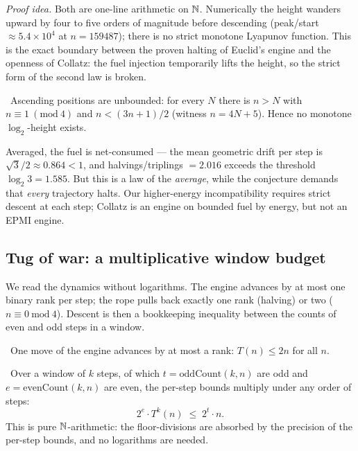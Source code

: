 \emph{Proof idea.} Both are one-line arithmetic on $\mathbb{N}$. Numerically the height wanders upward by
four to five orders of magnitude before descending (peak/start $\approx 5.4\times 10^{4}$ at
$n=159487$); there is no strict monotone Lyapunov function. This is the exact boundary between the
proven halting of Euclid's engine and the openness of Collatz: the fuel injection temporarily lifts
the height, so the strict form of the second law is broken.

\begin{theorem}\label{thm:no_monotone_height}
\green{}\ Ascending positions are unbounded: for every $N$ there is $n>N$ with $n\equiv 1\ (\mathrm{mod}\ 4)$
and $n<(3n+1)/2$ (witness $n=4N+5$). Hence no monotone $\log_2$-height exists.
\end{theorem}

Averaged, the fuel is net-consumed --- the mean geometric drift per step is $\sqrt{3}/2\approx
0.864<1$, and halvings/triplings $=2.016$ exceeds the threshold $\log_2 3=1.585$. But this is a law
of the \emph{average}, while the conjecture demands that \emph{every} trajectory halts. Our
higher-energy incompatibility requires strict descent at each step; Collatz is an engine on bounded
fuel by energy, but not an EPMI engine.

\subsection{Tug of war: a multiplicative window budget}

We read the dynamics without logarithms. The engine advances by at most one binary rank per step;
the rope pulls back exactly one rank (halving) or two ($n\equiv 0\ \mathrm{mod}\ 4$). Descent is
then a bookkeeping inequality between the counts of even and odd steps in a window.

\begin{theorem}\label{thm:engine_at_most_one_rank}
\green{}\ One move of the engine advances by at most a rank: $T(n)\le 2n$ for all $n$.
\end{theorem}

\begin{theorem}\label{thm:window_budget}
\green{}\ Over a window of $k$ steps, of which $t=\mathrm{oddCount}(k,n)$ are odd and
$e=\mathrm{evenCount}(k,n)$ are even, the per-step bounds multiply under any order of steps:
\begin{equation}\label{eq:window-budget}
2^{e}\cdot T^{k}(n)\;\le\;2^{t}\cdot n.
\end{equation}
This is pure $\mathbb{N}$-arithmetic: the floor-divisions are absorbed by the precision of the per-step
bounds, and no logarithms are needed. 
\end{theorem}

